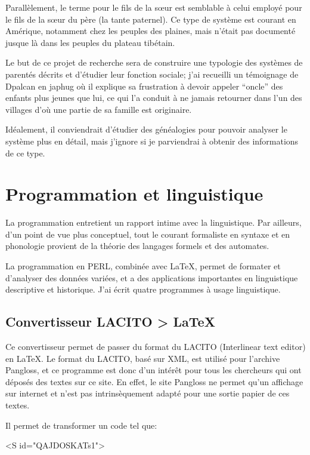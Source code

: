 \documentclass[oldfontcommands,oneside,a4paper,11pt]{memoir}
\begin{document}
Parallèlement, le terme pour le fils de la sœur est semblable à celui employé pour le fils de la sœur du père (la tante paternel).  Ce type de système est courant en Amérique, notamment chez les peuples des plaines, mais n'était pas documenté jusque là dans les peuples du plateau tibétain.


Le but de ce projet de recherche sera de construire une typologie des systèmes de parentés décrits et d'étudier leur fonction sociale; j'ai recueilli un témoignage de Dpalcan en japhug où il explique sa frustration à devoir appeler ``oncle'' des enfants plus jeunes que lui, ce qui l'a conduit à ne jamais retourner dans l'un des villages d'où une partie de sa famille est originaire.

Idéalement, il conviendrait d'étudier des généalogies pour pouvoir analyser le système plus en détail, mais j'ignore si je parviendrai à obtenir des informations de ce type.
 
\chapter{Programmation et linguistique}
La programmation entretient un rapport intime avec la linguistique.  Par ailleurs, d'un point de vue plus conceptuel, tout le courant formaliste en syntaxe et en phonologie provient de la théorie des langages formels et des automates. 



La programmation en PERL, combinée avec \LaTeX, permet de formater et d'analyser des données variées, et a des applications importantes en linguistique descriptive et   historique. J'ai écrit quatre programmes à usage linguistique.


\section{Convertisseur LACITO > \LaTeX}
Ce convertisseur permet de passer du format du LACITO (Interlinear text editor) en \LaTeX{}. Le format du LACITO, basé sur XML, est utilisé pour l'archive Pangloss, et ce programme est donc d'un intérêt pour tous les chercheurs qui ont déposés des textes sur ce site. En effet, le site Pangloss ne permet qu'un affichage sur internet et n'est pas intrinsèquement adapté pour une sortie papier de ces textes. 

Il permet de transformer un code tel que:



 <S id="QAJDOSKATs1">
 
\end{document}
